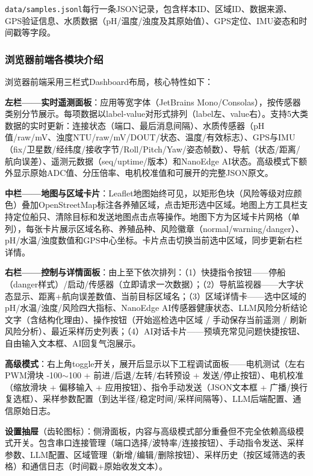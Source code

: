 \documentclass[12pt,a4paper]{ctexart}
\begin{document}
\texttt{data/samples.jsonl}每行一条JSON记录，包含样本ID、区域ID、数据来源、GPS验证信息、水质数据（pH/温度/浊度及其原始值）、GPS定位、IMU姿态和时间戳等字段。

\subsubsection{浏览器前端各模块介绍}

浏览器前端采用三栏式Dashboard布局，核心特性如下：

\textbf{左栏——实时遥测面板}：应用等宽字体（JetBrains Mono/Consolas），按传感器类别分节展示。每项数据以label-value对形式排列（label左、value右）。支持5大类数据的实时更新：连接状态（端口、最后消息间隔）、水质传感器（pH值/raw/mV、浊度NTU/raw/mV/DOUT/状态、温度/有效标志）、GPS与IMU（fix/卫星数/经纬度/接收字节/Roll/Pitch/Yaw/姿态帧数）、导航（状态/距离/航向误差）、遥测元数据（seq/uptime/版本）和NanoEdge AI状态。高级模式下额外显示原始ADC值、分压倍率、电机校准值和可展开的完整JSON原文。

\textbf{中栏——地图与区域卡片}：Leaflet地图始终可见，以矩形色块（风险等级对应颜色）叠加OpenStreetMap标注各养殖区域，点击矩形选中区域。地图上方工具栏支持定位船只、清除目标和发送地图点击点等操作。地图下方为区域卡片网格（单列），每张卡片展示区域名称、养殖品种、风险徽章（normal/warning/danger）、pH/水温/浊度数值和GPS中心坐标。卡片点击切换当前选中区域，同步更新右栏详情。

\textbf{右栏——控制与详情面板}：由上至下依次排列：（1）快捷指令按钮——停船（danger样式）/启动/传感器（立即请求一次数据）；（2）导航监视器——大字状态显示、距离+航向误差数值、当前目标区域名；（3）区域详情卡——选中区域的pH/水温/浊度/风险四大指标、NanoEdge AI传感器健康状态、LLM风险分析结论文字（含结构化理由）、操作按钮（开始巡检选中区域 / 手动保存当前遥测 / 刷新风险分析）、最近采样历史列表；（4）AI对话卡片——预填充常见问题快捷按钮、自由输入文本框、AI回复气泡展示。

\textbf{高级模式}：右上角toggle开关，展开后显示以下工程调试面板——电机测试（左右PWM滑块 -100$\sim$100 + 前进/后退/左转/右转预设 + 发送/停止按钮）、电机校准（缩放滑块 + 偏移输入 + 应用按钮）、指令手动发送（JSON文本框 + 广播/换行复选框）、采样参数配置（到达半径/稳定时间/采样间隔等）、LLM后端配置、通信原始日志。

\textbf{设置抽屉}（齿轮图标）：侧滑面板，内容与高级模式部分重叠但不完全依赖高级模式开关。包含串口连接管理（端口选择/波特率/连接按钮）、手动指令发送、采样参数、LLM配置、区域管理（新增/编辑/删除按钮）、采样历史（按区域筛选的表格）和通信日志（时间戳+原始收发文本）。
\end{document}
